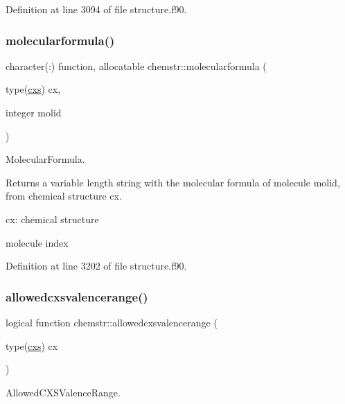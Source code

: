 Definition at line 3094 of file structure.\+f90.

\mbox{\label{namespacechemstr_a6659644537a7765bec46320eb5fbf579}} 
\subsubsection{\texorpdfstring{molecularformula()}{molecularformula()}}
{\footnotesize\ttfamily character(\+:) function, allocatable chemstr\+::molecularformula (\begin{DoxyParamCaption}\item[{type(\mbox{\hyperlink{structchemstr_1_1cxs}{cxs}})}]{cx,  }\item[{integer}]{molid }\end{DoxyParamCaption})}



Molecular\+Formula. 

Returns a variable length string with the molecular formula of molecule molid, from chemical structure cx.


\begin{DoxyItemize}
\item cx\+: chemical structure
\item molecule index 
\end{DoxyItemize}

Definition at line 3202 of file structure.\+f90.

\mbox{\label{namespacechemstr_aadd8f96c5bf2487db486c507835a660d}} 
\subsubsection{\texorpdfstring{allowedcxsvalencerange()}{allowedcxsvalencerange()}}
{\footnotesize\ttfamily logical function chemstr\+::allowedcxsvalencerange (\begin{DoxyParamCaption}\item[{type(\mbox{\hyperlink{structchemstr_1_1cxs}{cxs}})}]{cx }\end{DoxyParamCaption})}



Allowed\+C\+X\+S\+Valence\+Range. 

